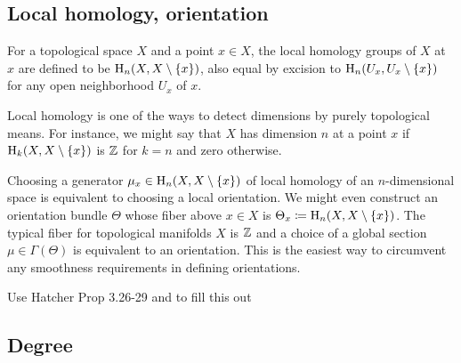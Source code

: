 \subsection{Local homology, orientation}

\begin{defn}
    For a topological space $X$ and a point $x\in X$, the local homology groups of $X$ at $x$ are defined to be $\mathrm{H}_n(X,X\setminus\{x\})$, also equal by excision to $\mathrm{H}_n(U_x,U_x\setminus\{x\})$ for any open neighborhood $U_x$ of $x$.
\end{defn}

\begin{rem}
    Local homology is one of the ways to detect dimensions by purely topological means. For instance, we might say that $X$ has dimension $n$ at a point $x$ if $\mathrm{H}_k(X,X\setminus\{x\})$ is $\mathbb{Z}$ for $k=n$ and zero otherwise.
    
    Choosing a generator $\mu_x\in \mathrm{H}_n(X,X\setminus\{x\}) $ of local homology of an $n$-dimensional space is equivalent to choosing a local orientation. We might even construct an orientation bundle $\Theta$ whose fiber above $x\in X$ is $\Theta_x\coloneqq \mathrm{H}_n(X,X\setminus\{x\})$. The typical fiber for topological manifolds $X$ is $\mathbb{Z}$ and a choice of a global section $\mu\in\Gamma(\Theta)$ is equivalent to an orientation. This is the easiest way to circumvent any smoothness requirements in defining orientations.
\end{rem}

Use Hatcher Prop 3.26-29 and  to fill this out


\subsection{Degree}

